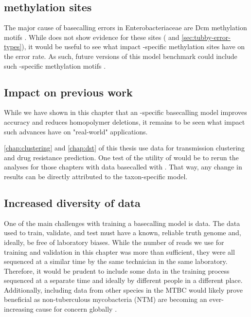 \subsection{\mtb{} methylation sites}
The major cause of \guppy{} basecalling errors in Enterobacteriaceae are Dcm methylation motifs \cite{wick2019}. While \mtb{} does not show evidence for these sites (\cite{Danjuma2017} and \autoref{sec:tubby-error-types}), it would be useful to see what impact \mtb{}-specific methylation sites have on the error rate. As such, future versions of this model benchmark could include such \mtb{}-specific methylation motifs \cite{chiner2019,modlin2020}.

\subsection{Impact on previous work}
While we have shown in this chapter that an \mtb{}-specific basecalling model improves accuracy and reduces homopolymer deletions, it remains to be seen what impact such advances have on "real-world" applications. 

\autoref{chap:clustering} and \autoref{chap:dst} of this thesis use \ont{} data for \mtb{} transmission clustering and drug resistance prediction. One test of the utility of \tubby{} would be to rerun the analyses for those chapters with \ont{} data basecalled with \tubby{}. That way, any change in results can be directly attributed to the taxon-specific model.

\subsection{Increased diversity of data}
One of the main challenges with training a basecalling model is data. The data used to train, validate, and test must have a known, reliable truth genome and, ideally, be free of laboratory biases. While the number of reads we use for training and validation in this chapter was more than sufficient, they were all sequenced at a similar time by the same technician in the same laboratory. Therefore, it would be prudent to include some data in the training process sequenced at a separate time and ideally by different people in a different place. Additionally, including data from other species in the MTBC would likely prove beneficial as non-tuberculous mycobacteria (NTM) are becoming an ever-increasing cause for concern globally \cite{Johansen2020}.

